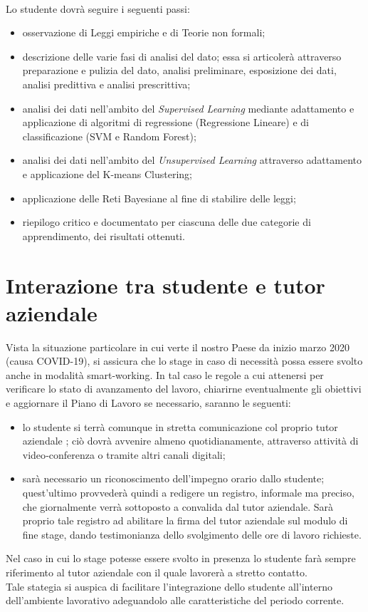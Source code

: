 \\Lo studente dovrà seguire i seguenti passi:
\begin{itemize}
\item osservazione di Leggi empiriche e di Teorie non formali;
\item descrizione delle varie fasi di analisi del dato; essa si articolerà attraverso preparazione e pulizia del dato, analisi preliminare, esposizione dei dati, analisi predittiva e analisi prescrittiva;  
\item analisi dei dati nell'ambito del \textit{Supervised Learning} mediante adattamento e applicazione di algoritmi di regressione (Regressione Lineare) e di classificazione (SVM e Random Forest);
\item analisi dei dati nell'ambito del \textit{Unsupervised Learning} attraverso  adattamento e applicazione del K-means Clustering;
\item applicazione delle Reti Bayesiane al fine di stabilire delle leggi;
\item riepilogo critico e documentato per ciascuna delle due categorie di apprendimento, dei risultati ottenuti.
\end{itemize}

\section{Interazione tra studente e tutor aziendale}
Vista la situazione particolare in cui verte il nostro Paese da inizio marzo 2020 (causa COVID-19), si assicura che lo stage in caso di necessità possa essere svolto anche in modalità smart-working. In tal caso le regole a cui attenersi per verificare lo stato di avanzamento del lavoro, chiarirne eventualmente gli obiettivi e aggiornare il Piano di Lavoro se necessario, saranno le seguenti:
\begin{itemize}
\item lo studente si terrà comunque in stretta comunicazione col proprio tutor aziendale \Greg; ciò dovrà avvenire almeno quotidianamente, attraverso attività di video‐conferenza o tramite altri canali digitali;
\item sarà necessario un riconoscimento dell'impegno orario dallo studente; quest'ultimo provvederà quindi a redigere un registro, informale ma preciso, che giornalmente verrà sottoposto a convalida dal tutor aziendale. Sarà proprio tale registro ad abilitare la firma del tutor aziendale sul modulo di fine stage, dando testimonianza dello svolgimento delle ore di lavoro richieste.
\end{itemize}  
Nel caso in cui lo stage potesse essere svolto in presenza lo studente farà sempre riferimento al tutor aziendale \Greg{} con il quale lavorerà a stretto contatto. \\Tale stategia si auspica di facilitare l'integrazione dello studente all'interno dell'ambiente lavorativo adeguandolo alle caratteristiche del periodo corrente.

